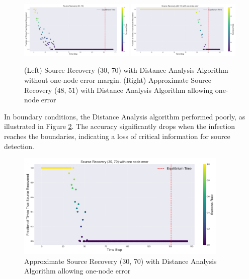 \begin{figure}[H]
\centering
\includegraphics[width=0.49\textwidth]{img/Source_Recovery_30_70_Distance_analysis.png}
\includegraphics[width=0.49\textwidth]{img/Approx_Source_Recovery_48_51_Distance_Analysis.png}
\caption{(Left) Source Recovery (30, 70) with Distance Analysis Algorithm without one-node error margin. (Right) Approximate Source Recovery (48, 51) with Distance Analysis Algorithm allowing one-node error}
\label{Source_recovery_distance_analysis}
\end{figure}

In boundary conditions, the Distance Analysis algorithm performed poorly, as illustrated in Figure \ref{boundary_handling_distance_analysis}. The accuracy significantly drops when the infection reaches the boundaries, indicating a loss of critical information for source detection.

\begin{figure}[H]
\centering
\includegraphics[width=0.9\textwidth]{img/Approx_Source_Recovery_30_70_Distance_Analysis.png}
\caption{Approximate Source Recovery (30, 70) with Distance Analysis Algorithm allowing one-node error}
\label{boundary_handling_distance_analysis}
\end{figure}

